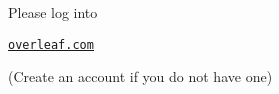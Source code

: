 \begin{frame}
	\titlepage
	\centering

	{\Large Please log into}

	\vspace{10pt}
	\href{https://www.overleaf.com}{\huge\ul{\texttt{overleaf.com}}}

	\vspace{10pt}
	{\small (Create an account if you do not have one)}
\end{frame}